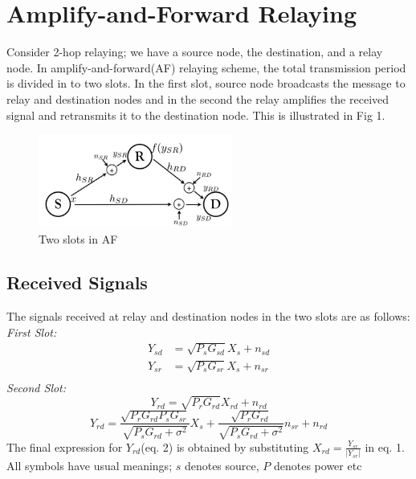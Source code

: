 \documentclass[conference]{IEEEtran}
\begin{document}



\section{Amplify-and-Forward Relaying}
Consider 2-hop relaying; we have a source node, the destination, and a relay
node. In amplify-and-forward(AF) relaying scheme, the total transmission period is
divided in to two slots.
In the first slot, source node broadcasts the message to relay and destination nodes
and in the second the relay amplifies the received signal and retransmits it to 
the destination node. This is illustrated in Fig 1.
\begin{figure}[!t] 
	\centering 
	\includegraphics[width=2.5in]{img/twoslots.png} 
	\caption{Two slots in AF}
	\label{twoSlots} 
\end{figure}
\subsection{Received Signals }
The signals received at relay and destination nodes in the two slots are as 
follows:\\
\textit{First Slot:}
\begin{align*}
	Y_{sd} &= \sqrt{P_s G_{sd}} X_s + n_{sd} \\
	Y_{sr} &= \sqrt{P_s G_{sr}} X_s + n_{sr} \\
\end{align*}
\textit{Second Slot:}
\begin{equation}
	Y_{rd} = \sqrt{P_r G_{rd}} X_{rd} + n_{rd} 
\end{equation}
\begin{equation}
	Y_{rd} = \frac{\sqrt{P_r G_{rd} P_s G_{sr}}}{\sqrt{P_s G_{rd} + \sigma^2}}X_s + \frac{\sqrt{P_rG_{rd}}}{\sqrt{P_s G_{rd} + \sigma^2}} n_{sr} + n_{rd} 
\end{equation}
The final expression for $Y_{rd}$(eq. 2) is obtained by substituting
$X_{rd} = \frac{Y_{sr}}{|Y_{sr}|}$ in eq. 1. All symbols have usual 
meanings; $s$ denotes source, $P$ denotes power etc
\\ \\ 
\end{document}
